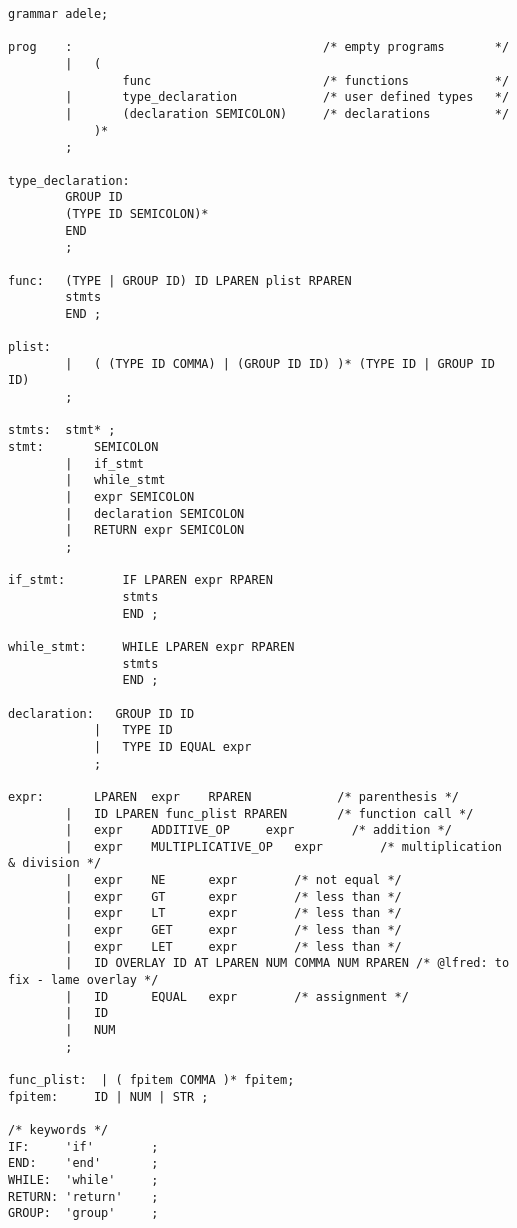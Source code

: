 \documentclass[11pt,letterpaper]{article}
\begin{document}
\begin{lstlisting}[tabsize=2]
grammar adele;

prog    :                                   /* empty programs       */ 
        |   ( 
                func                        /* functions            */
        |       type_declaration            /* user defined types   */
        |       (declaration SEMICOLON)     /* declarations         */
            )*              
        ;
        
type_declaration:
        GROUP ID 
        (TYPE ID SEMICOLON)* 
        END
        ;

func:   (TYPE | GROUP ID) ID LPAREN plist RPAREN 
        stmts
        END ;

plist:  
        |   ( (TYPE ID COMMA) | (GROUP ID ID) )* (TYPE ID | GROUP ID ID) 
        ;

stmts:  stmt* ;
stmt:       SEMICOLON       
        |   if_stmt       
        |   while_stmt      
        |   expr SEMICOLON  
        |   declaration SEMICOLON
        |   RETURN expr SEMICOLON
        ;

if_stmt:        IF LPAREN expr RPAREN 
                stmts 
                END ;

while_stmt:     WHILE LPAREN expr RPAREN 
                stmts 
                END ;

declaration:   GROUP ID ID
            |   TYPE ID 
            |   TYPE ID EQUAL expr
            ;

expr:       LPAREN  expr    RPAREN            /* parenthesis */
        |   ID LPAREN func_plist RPAREN       /* function call */
        |   expr    ADDITIVE_OP     expr        /* addition */
        |   expr    MULTIPLICATIVE_OP   expr        /* multiplication & division */
        |   expr    NE      expr        /* not equal */
        |   expr    GT      expr        /* less than */
        |   expr    LT      expr        /* less than */
        |   expr    GET     expr        /* less than */
        |   expr    LET     expr        /* less than */
        |   ID OVERLAY ID AT LPAREN NUM COMMA NUM RPAREN /* @lfred: to fix - lame overlay */
        |   ID      EQUAL   expr        /* assignment */
        |   ID  
        |   NUM
        ; 

func_plist:  | ( fpitem COMMA )* fpitem;
fpitem:     ID | NUM | STR ;

/* keywords */
IF:     'if'        ;
END:    'end'       ;
WHILE:  'while'     ;
RETURN: 'return'    ;
GROUP:  'group'     ;


\end{lstlisting}
\end{document}
